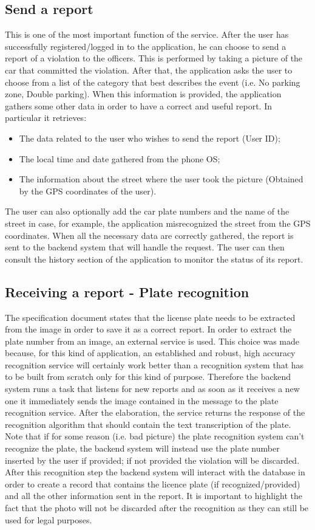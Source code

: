 \subsection{Send a report}
This is one of the most important function of the service. After the user has successfully registered/logged in to the application, he can choose to send a report of a violation to the officers. This is performed by taking a picture of the car that committed the violation. After that, the application asks the user to choose from a list of the category that best describes the event (i.e. No parking zone, Double parking). When this information is provided, the application gathers some other data in order to have a correct and useful report. In particular it retrieves: 
\begin{itemize}
  \item The data related to the user who wishes to send the report (User ID);
  \item The local time and date gathered from the phone OS;
  \item The information about the street where the user took the picture (Obtained by the GPS coordinates of the user).
\end{itemize}

The user can also optionally add the car plate numbers and the name of the street in case, for example, the application misrecognized the street from the GPS coordinates. When all the necessary data are correctly gathered, the report is sent to the backend system that will handle the request. The user can then consult the history section of the application to monitor the status of its report.

\subsection{Receiving a report - Plate recognition}
The specification document states that the license plate needs to be extracted from the image in order to save it as a correct report. In order to extract the plate number from an image, an external service is used. This choice was made because, for this kind of application, an established and robust, high accuracy recognition service will certainly work better than a recognition system that has to be built from scratch only for this kind of purpose. Therefore the backend system runs a task that listens for new reports and as soon as it receives a new one it immediately sends the image contained in the message to the plate recognition service. After the elaboration, the service returns the response of the recognition algorithm that should contain the text transcription of the plate. Note that if for some reason (i.e. bad picture) the plate recognition system can't recognize the plate, the backend system will instead use the plate number inserted by the user if provided; if not provided the violation will be discarded. After this recognition step the backend system will interact with the database in order to create a record that contains the licence plate (if recognized/provided) and all the other information sent in the report. It is important to highlight the fact that the photo will not be discarded after the recognition as they can still be used for legal purposes.

